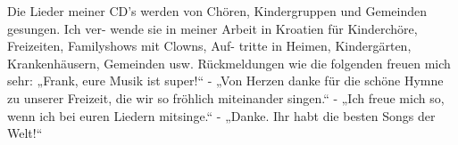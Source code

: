 \documentclass[a4paper,twoside, svgnames]{article}
\begin{document}
\newpage
\begin{multicols}{2}

    \begin{onehalfspacing}
        \begin{justify}
Die Lieder meiner CD’s werden von Chören, Kindergruppen und Gemeinden gesungen. Ich ver-
wende sie in meiner Arbeit in Kroatien für Kinderchöre, Freizeiten, Familyshows mit Clowns, Auf-
tritte in Heimen, Kindergärten, Krankenhäusern, Gemeinden usw.
Rückmeldungen wie die folgenden freuen mich sehr:
„Frank, eure Musik ist super!“ - „Von Herzen danke für die schöne Hymne zu unserer Freizeit, die
wir so fröhlich miteinander singen.“ - „Ich freue mich so, wenn ich bei euren Liedern mitsinge.“ -
„Danke. Ihr habt die besten Songs der Welt!“


\end{justify}
\end{onehalfspacing}
\end{multicols}
\end{document}
